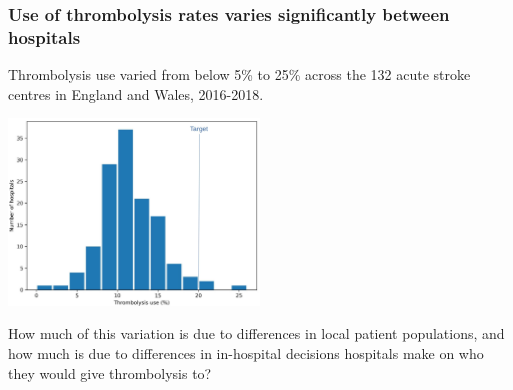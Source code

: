 \begin{frame}
\frametitle{Use of thrombolysis rates varies significantly between hospitals}

\small
Thrombolysis use varied from below 5\% to 25\% across the 132 acute stroke centres in England and Wales, 2016-2018.
\begin{center}
\includegraphics[width=0.50\textwidth]{./images/thrombolysis_by_hospital}
\end{center}

How much of this variation is due to differences in local patient populations, and how much is due to differences in in-hospital decisions hospitals make on who they would give thrombolysis to?
\end{frame}